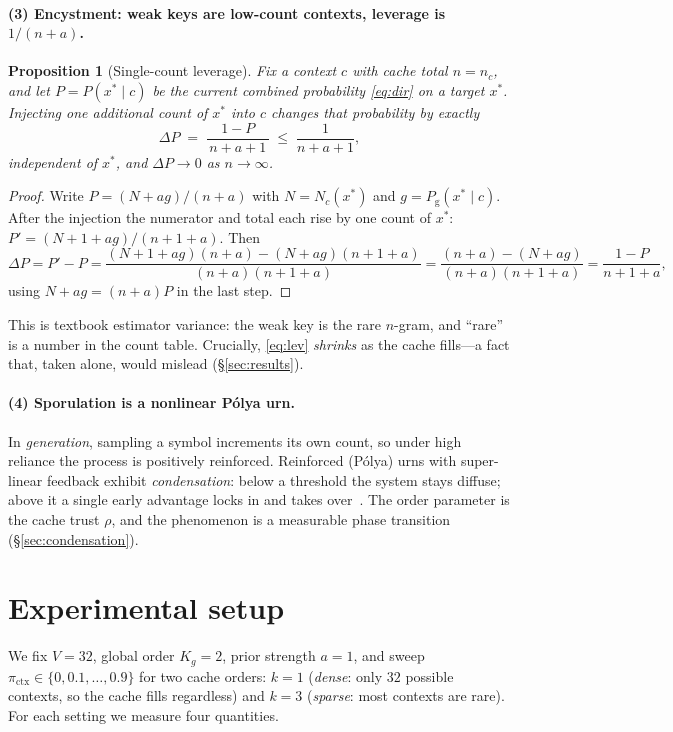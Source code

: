 \documentclass[11pt]{article}
\theoremstyle{plain}
\newtheorem{proposition}{Proposition}
\theoremstyle{definition}
\theoremstyle{remark}
\newcommand{\pictx}{\pi_{\text{ctx}}}
\newcommand{\Pglob}{P_{\text{g}}}
\newcommand{\xstar}{x^{\!*}}
\begin{document}
\paragraph{(3) Encystment: weak keys are low-count contexts, leverage is $1/(n+a)$.}
\begin{proposition}[Single-count leverage]\label{prop:leverage}
Fix a context $c$ with cache total $n=n_c$, and let $P=P(\xstar\mid c)$ be the current
combined probability \eqref{eq:dir} on a target $\xstar$. Injecting one additional count of
$\xstar$ into $c$ changes that probability by exactly
\begin{equation}\label{eq:lev}
\Delta P \;=\; \frac{1-P}{\,n+a+1\,}\;\le\;\frac{1}{n+a+1},
\end{equation}
independent of $\xstar$, and $\Delta P\to 0$ as $n\to\infty$.
\end{proposition}
\begin{proof}
Write $P=(N+ag)/(n+a)$ with $N=N_c(\xstar)$ and $g=\Pglob(\xstar\mid c)$. After the
injection the numerator and total each rise by one count of $\xstar$:
$P'=(N+1+ag)/(n+1+a)$. Then
\[
\Delta P=P'-P=\frac{(N+1+ag)(n+a)-(N+ag)(n+1+a)}{(n+a)(n+1+a)}
=\frac{(n+a)-(N+ag)}{(n+a)(n+1+a)}=\frac{1-P}{n+1+a},
\]
using $N+ag=(n+a)P$ in the last step.\qedhere
\end{proof}
This is textbook estimator variance: the weak key is the rare $n$-gram, and ``rare'' is a
number in the count table. Crucially, \eqref{eq:lev} \emph{shrinks} as the cache fills---a
fact that, taken alone, would mislead (\S\ref{sec:results}).

\paragraph{(4) Sporulation is a nonlinear P\'olya urn.}
In \emph{generation}, sampling a symbol increments its own count, so under high reliance the
process is positively reinforced. Reinforced (P\'olya) urns with super-linear feedback
exhibit \emph{condensation}: below a threshold the system stays diffuse; above it a single
early advantage locks in and takes over~\cite{pemantle2007,chung2003}. The order parameter is
the cache trust $\rho$, and the phenomenon is a measurable phase transition
(\S\ref{sec:condensation}).

\section{Experimental setup}\label{sec:setup}
We fix $V=32$, global order $K_g=2$, prior strength $a=1$, and sweep $\pictx\in\{0,0.1,
\dots,0.9\}$ for two cache orders: $k=1$ (\emph{dense}: only $32$ possible contexts, so the
cache fills regardless) and $k=3$ (\emph{sparse}: most contexts are rare). For each setting
we measure four quantities.
\end{document}
